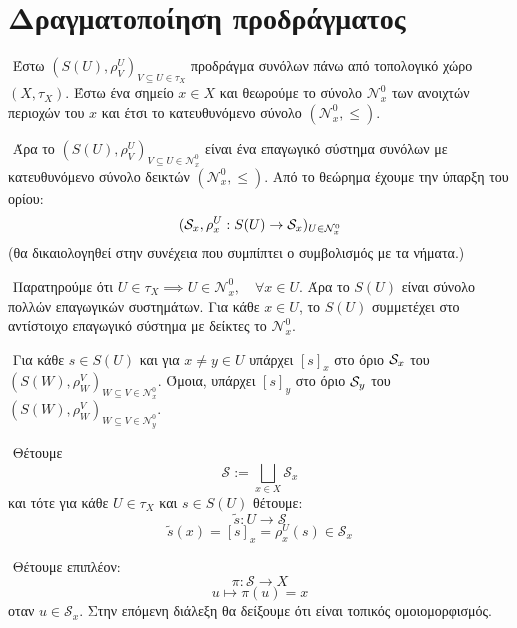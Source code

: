 \section*{Δραγματοποίηση προδράγματος}

$ $\newline
Έστω $(S(U),\rho^U_V)_{V\subseteq U\in \tau_X}$ προδράγμα συνόλων πάνω από τοπολογικό χώρο $(X,\tau_X)$. Έστω ένα σημείο $x \in X$ και θεωρούμε το σύνολο $\mathcal{N}^0_x$ των ανοιχτών περιοχών του $x$ και έτσι το κατευθυνόμενο σύνολο $(\mathcal{N}^0_x,\leq)$.

$ $\newline
Άρα το $(S(U),\rho^U_V)_{V\subseteq U \in \mathcal{N}^0_x}$ είναι ένα επαγωγικό σύστημα συνόλων με κατευθυνόμενο σύνολο δεικτών $(\mathcal{N}^0_x,\leq)$. Από το θεώρημα έχουμε την ύπαρξη του ορίου:
$$(\mathcal{S}_x,\rho^U_x: S(U)\rightarrow \mathcal{S}_x)_{U \in \mathcal{N}^0_x}$$ (θα δικαιολογηθεί στην συνέχεια που συμπίπτει ο συμβολισμός με τα νήματα.)

$ $\newline
Παρατηρούμε ότι $U\in \tau_X \implies U \in \mathcal{N}^0_x, \quad \forall x \in U$. Άρα το $S(U)$ είναι σύνολο πολλών επαγωγικών συστημάτων. Για κάθε $x \in U$, το $S(U)$ συμμετέχει στο αντίστοιχο επαγωγικό σύστημα με δείκτες το $\mathcal{N}^0_x$.

$ $\newline
Για κάθε $s \in S(U)$ και για $x\neq y \in U$ υπάρχει $[s]_x$ στο όριο $\mathcal{S}_x$ του $(S(W),\rho^V_W)_{W\subseteq V \in \mathcal{N}^0_x}$. Όμοια, υπάρχει $[s]_y$ στο όριο $\mathcal{S}_y$ του $(S(W),\rho^V_W)_{W\subseteq V \in \mathcal{N}^0_y}$.

$ $\newline
Θέτουμε 
$$\mathcal{S} := \bigsqcup\limits_{x \in X} \mathcal{S}_x$$ και τότε για κάθε $U \in \tau_X$ και $s \in S(U)$ θέτουμε:
$$\tilde{s}: U \longrightarrow \mathcal{S}$$
$$\tilde{s}(x) = [s]_x = \rho^U_x(s) \in \mathcal{S}_x$$



\begin{figure}[H]
    \centering
\end{figure}

$ $\newline
Θέτουμε επιπλέον: 
$$\pi:\mathcal{S} \longrightarrow X$$
$$u\longmapsto \pi(u) = x$$ οταν $u \in \mathcal{S}_x$. Στην επόμενη διάλεξη θα δείξουμε ότι είναι τοπικός ομοιομορφισμός.